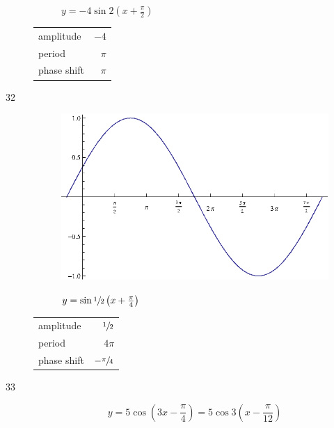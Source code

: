 \documentclass{exam}
\begin{document}
\begin{description}
\begin{figure}[H]
          $y = -4 \sin 2 \left( x + \frac{\pi}{2} \right)$
        \end{figure}

        \begin{tabular}[H]{lr}
          \toprule
          amplitude   & $-4$ \\
          period      & $\pi$ \\
          phase shift & $\pi$ \\
          \bottomrule
        \end{tabular}

      \item[32]
        \begin{figure}[H]
          \centering
          \includegraphics[scale=0.8]{exercise32.eps}

          $y = \sin \sfrac{1}{2} \left( x + \frac{\pi}{4} \right)$
        \end{figure}

        \begin{tabular}[H]{lr}
          \toprule
          amplitude   & $\sfrac{1}{2}$ \\
          period      & $4 \pi$ \\
          phase shift & $- \sfrac{\pi}{4}$ \\
          \bottomrule
        \end{tabular}

      \item[33]
        \[
          y = 5 \cos \left( 3x - \frac{\pi}{4} \right) = 5 \cos 3 \left( x - \frac{\pi}{12} \right)
        \]


\end{description}
\end{document}
